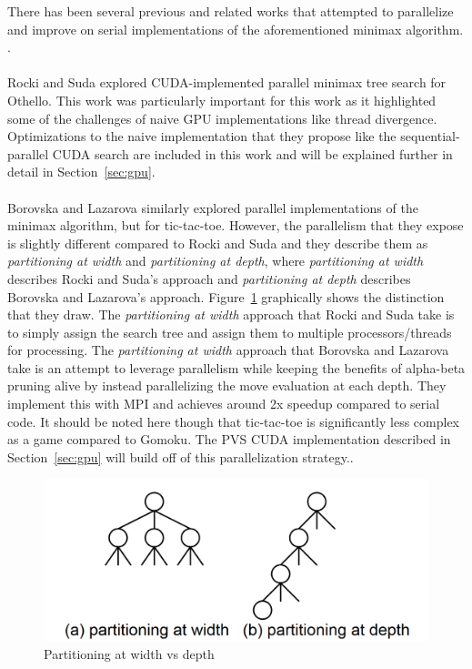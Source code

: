 There has been several previous and related works that attempted to parallelize and improve on serial implementations of the aforementioned minimax algorithm.\cite{borovska} \cite{Rocki} \cite{Mandadi}.\\
\\
Rocki and Suda explored CUDA-implemented parallel minimax tree search for Othello. This work was particularly important for this work as it highlighted some of the challenges of naive GPU implementations like thread divergence. Optimizations to the naive implementation that they propose like the sequential-parallel CUDA search are included in this work and will be explained further in detail in Section~\ref{sec:gpu}. \cite{Rocki}\\
\\
Borovska and Lazarova similarly explored parallel implementations of the minimax algorithm, but for tic-tac-toe. However, the parallelism that they expose is slightly different compared to Rocki and Suda and they describe them as \textit{partitioning at width} and \textit{partitioning at depth}, where \textit{partitioning at width} describes Rocki and Suda's approach and \textit{partitioning at depth} describes Borovska and Lazarova's approach. Figure~\ref{fig:widthvdepth} graphically shows the distinction that they draw. The \textit{partitioning at width} approach that Rocki and Suda take is to simply assign the search tree and assign them to multiple processors/threads for processing. The \textit{partitioning at width} approach that Borovska and Lazarova take is an attempt to leverage parallelism while keeping the benefits of alpha-beta pruning alive by instead parallelizing the move evaluation at each depth. They implement this with MPI and achieves around 2x speedup compared to serial code. It should be noted here though that tic-tac-toe is significantly less complex as a game compared to Gomoku. The PVS CUDA implementation described in Section~\ref{sec:gpu} will build off of this parallelization strategy.\cite{borovska}.


\begin{figure}[!htbp]
    \centering
    \includegraphics[scale=0.3]{images/relwork1.PNG}
    \caption{Partitioning at width vs depth}
    \label{fig:widthvdepth}
\end{figure}

